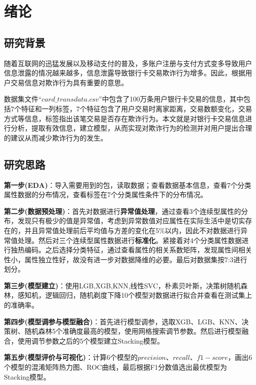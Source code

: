 \pagestyle{fancy}
\setcounter{page}{1}%
\chead{}

\section{绪论}
\subsection{研究背景}
随着互联网的迅猛发展以及移动支付的普及，多账户注册与支付方式变多导致用户信息泄露的情况越来越多，信息泄露导致银行卡交易欺诈行为增多。因此，根据用户交易信息对欺诈行为具有重要的意思。

数据集文件$“card\_transdata.csv”$中包含了100万条用户银行卡交易的信息，其中包括7个特征和一列标签，7个特征包含了用户交易时离家距离，交易数额变化，交易方式等信息，标签指出该笔交易是否存在欺诈行为。本文就是对银行卡交易信息进行分析，提取有效信息，建立模型，从而实现对欺诈行为的检测并对用户提出合理的建议从而减少欺诈行为的发生。



\subsection{研究思路}
\textbf{第一步(EDA)}：导入需要用到的包，读取数据；查看数据基本信息，查看7个分类属性数据的分布情况，查看标签在7个分类属性条件下的分布情况。


\textbf{第二步(数据预处理)}：首先对数据进行\textbf{异常值处理}，通过查看3个连续型属性的分布，发现只有极少的值是异常值，考虑到异常数值对应属性在实际生活中是切实存在的，并且异常值处理前后平均值与方差的变化在5\%以内，因此不对数据进行异常值处理。然后对三个连续型属性数据进行\textbf{标准化}。紧接着对4个分类属性数据进行独热编码。之后选择分类特征，通过查看属性的相关系数矩阵，发现属性间相关性小，属性独立性好，故没有进一步对数据降维的必要。最后对数据集按7:3进行划分。

\textbf{第三步(模型建立)}：使用LGB,XGB,KNN,线性SVC，朴素贝叶斯，决策树随机森林，感知机，逻辑回归，随机剃度下降10个模型对数据进行拟合并查看在测试集上的准确率。


\textbf{第四步(模型调参与模型融合)}：首先进行模型调参，选取XGB、LGB、KNN、决策树、随机森林5个准确度最高的模型，使用网格搜索调节参数。然后进行模型融合，使用调节参数之后的5个模型建立Stacking模型。



\textbf{第五步(模型评价与可视化)}：计算6个模型的$precision$、$recall$、$f1-score$，画出6个模型的混淆矩阵热力图、ROC曲线，最后根据F1分数值选出最优模型为Stacking模型。


